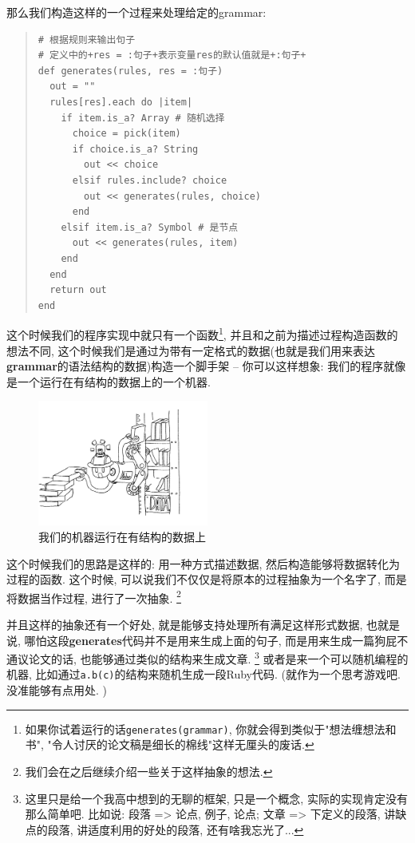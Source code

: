 \begin{example}
  那么我们构造这样的一个过程来处理给定的grammar: 

  \begin{quotation}
    \begin{verbatim}
# 根据规则来输出句子
# 定义中的+res = :句子+表示变量res的默认值就是+:句子+
def generates(rules, res = :句子)
  out = ""
  rules[res].each do |item|
    if item.is_a? Array # 随机选择
      choice = pick(item)
      if choice.is_a? String
        out << choice
      elsif rules.include? choice
        out << generates(rules, choice)
      end
    elsif item.is_a? Symbol # 是节点
      out << generates(rules, item)
    end
  end
  return out
end
    \end{verbatim}
  \end{quotation}

  这个时候我们的程序实现中就只有一个函数\footnote{如果你试着运行的话\texttt{generates(grammar)}, 你就会得到类似于"想法缠想法和书", "令人讨厌的论文稿是细长的棉线"这样无厘头的废话. }, 并且和之前为描述过程构造函数的想法不同, 这个时候我们是通过为带有一定格式的数据(也就是我们用来表达\textbf{grammar}的语法结构的数据)构造一个脚手架 -- 你可以这样想象: 我们的程序就像是一个运行在有结构的数据上的一个机器. 

  \begin{figure}[h]
    \centering
    \includegraphics[width=0.5\textwidth]{image/chapter/1_language/operate_on_data.jpg}
    \caption{我们的机器运行在有结构的数据上}
  \end{figure}


  这个时候我们的思路是这样的: 用一种方式描述数据, 然后构造能够将数据转化为过程的函数. 这个时候, 可以说我们不仅仅是将原本的过程抽象为一个名字了, 而是将数据当作过程, 进行了一次抽象. \footnote{我们会在之后继续介绍一些关于这样抽象的想法. }

  并且这样的抽象还有一个好处, 就是能够支持处理所有满足这样形式数据, 也就是说, 哪怕这段\textbf{generates}代码并不是用来生成上面的句子, 而是用来生成一篇狗屁不通议论文的话, 也能够通过类似的结构来生成文章. \footnote{这里只是给一个我高中想到的无聊的框架, 只是一个概念, 实际的实现肯定没有那么简单吧. 比如说: 段落 => 论点, 例子, 论点; 文章 => 下定义的段落, 讲缺点的段落, 讲适度利用的好处的段落, 还有啥我忘光了...} 或者是来一个可以随机编程的机器, 比如通过\texttt{a.b(c)}的结构来随机生成一段Ruby代码. (就作为一个思考游戏吧. 没准能够有点用处. )
\end{example}

